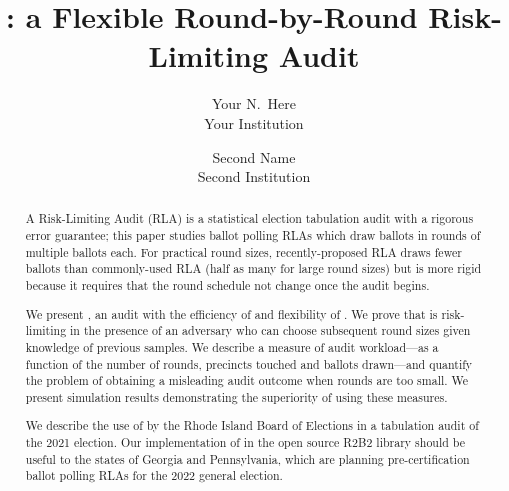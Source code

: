 \title{\Large \bf \Providence: a Flexible Round-by-Round Risk-Limiting Audit}


\author{
{\rm Your N.\ Here}\\
Your Institution
\and
{\rm Second Name}\\
Second Institution
} %

\maketitle

\begin{abstract}
A Risk-Limiting Audit (RLA) is a statistical election tabulation audit with a rigorous error guarantee; this paper studies ballot polling RLAs which draw ballots in rounds of multiple ballots each. For practical round sizes, recently-proposed RLA \Minerva draws fewer ballots than commonly-used RLA \BRAVO (half as many for large round sizes) but is more rigid because it requires that the round schedule not change once the audit begins. 

We present \Providence, an audit with the efficiency of \Minerva and flexibility of \BRAVO. We prove that \Providence is risk-limiting in the presence of an adversary who can choose subsequent round sizes given knowledge of previous samples. We describe a measure of audit workload---as a function of the number of rounds, precincts touched and ballots drawn---and quantify the problem of obtaining a misleading audit outcome when rounds are too small. We present simulation results demonstrating the superiority of \Providence using these measures. 

We describe the use of \Providence by the Rhode Island Board of Elections in a tabulation audit of the 2021 election. Our implementation of \Providence in the open source R2B2 library should be useful to the states of Georgia and Pennsylvania, which are planning pre-certification ballot polling RLAs for the 2022 general election. 
\end{abstract}
%
%

